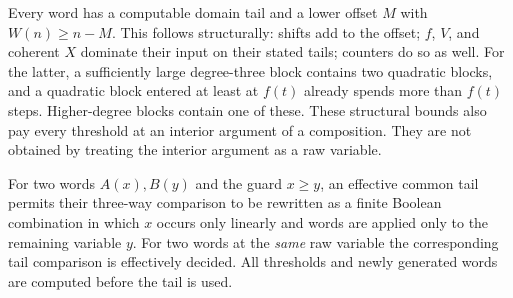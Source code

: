 \documentclass[11pt]{article}
\begin{document}
Every word has a computable domain tail and a lower offset $M$ with
$W(n)\ge n-M$. This follows structurally: shifts add to the offset;
$f$, $V$, and coherent $X$ dominate their input on their stated tails;
counters do so as well. For the latter, a sufficiently large degree-three
block contains two quadratic blocks, and a quadratic block entered at
least at $f(t)$ already spends more than $f(t)$ steps. Higher-degree blocks
contain one of these. These structural bounds also pay every threshold at
an interior argument of a composition. They are not obtained by treating
the interior argument as a raw variable.

\begin{lemma}\label{lem:guards}
For two words $A(x),B(y)$ and the guard $x\ge y$, an effective common
tail permits their three-way comparison to be rewritten as a finite Boolean
combination in which $x$ occurs only linearly and words are applied only
to the remaining variable $y$. For two words at the \emph{same} raw
variable the corresponding tail comparison is effectively decided.
All thresholds and newly generated words are computed before the tail is
used.
\end{lemma}
\end{document}
